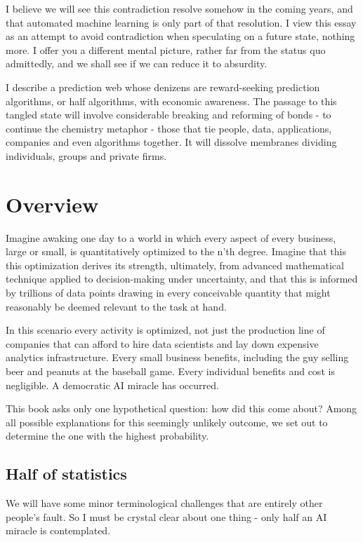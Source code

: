 I believe we will see this contradiction resolve somehow in the coming years, and that automated machine learning is only part of that resolution. I view this essay as an attempt to avoid contradiction when speculating on a future state, nothing more. I offer you a different mental picture, rather far from the status quo admittedly, and we shall see if we can reduce it to absurdity. 


I describe a prediction web whose denizens are reward-seeking prediction algorithms, or half algorithms, with economic awareness. The passage to this tangled state will involve considerable breaking and reforming of bonds - to continue the chemistry metaphor - those that tie people, data, applications, companies and even algorithms together. It will dissolve membranes dividing individuals, groups and private firms. 

\fi



\chapter{Overview}
\label{chapter:introduction}


Imagine awaking one day to a world in which every aspect of every business, large or small, is quantitatively optimized to the n'th degree. Imagine that this this optimization derives its strength, ultimately, from advanced mathematical technique applied to decision-making under uncertainty, and that this is informed by trillions of data points drawing in every conceivable quantity that might reasonably be deemed relevant to the task at hand. 

In this scenario every activity is optimized, not just the production line of companies that can afford to hire data scientists and lay down expensive analytics infrastructure. Every small business benefits, including the guy selling beer and peanuts at the baseball game. Every individual benefits and cost is negligible. A democratic AI miracle has occurred.   

This book asks only one hypothetical question: how did this come about?  Among all possible explanations for this seemingly unlikely outcome, we set out to determine the one with the highest probability. 

\section{Half of statistics}

We will have some minor terminological challenges that are entirely other people's fault. So I must be crystal clear about one thing - only half an AI miracle is contemplated.

